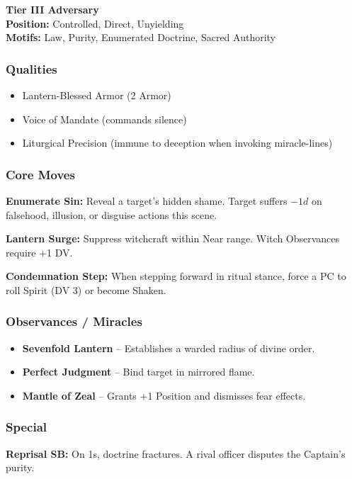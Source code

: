 \documentclass[11pt]{book}
\begin{document}
\textbf{Tier III Adversary} \\
\textbf{Position:} Controlled, Direct, Unyielding \\
\textbf{Motifs:} Law, Purity, Enumerated Doctrine, Sacred Authority

\subsubsection*{Qualities}
\begin{itemize}[leftmargin=*]
    \item Lantern-Blessed Armor (2 Armor)
    \item Voice of Mandate (commands silence)
    \item Liturgical Precision (immune to deception when invoking miracle-lines)
\end{itemize}

\subsubsection*{Core Moves}
\textbf{Enumerate Sin:} Reveal a target's hidden shame. Target suffers $-1d$ 
on falsehood, illusion, or disguise actions this scene.

\textbf{Lantern Surge:} Suppress witchcraft within Near range. Witch Observances require +1 DV.

\textbf{Condemnation Step:} When stepping forward in ritual stance, force a PC 
to roll Spirit (DV 3) or become Shaken.

\subsubsection*{Observances / Miracles}
\begin{itemize}[leftmargin=*]
    \item \textbf{Sevenfold Lantern} -- Establishes a warded radius of divine order.
    \item \textbf{Perfect Judgment} -- Bind target in mirrored flame. 
    \item \textbf{Mantle of Zeal} -- Grants +1 Position and dismisses fear effects.
\end{itemize}

\subsubsection*{Special}
\textbf{Reprisal SB:} On 1s, doctrine fractures. A rival officer disputes the Captain's purity.
\end{document}
